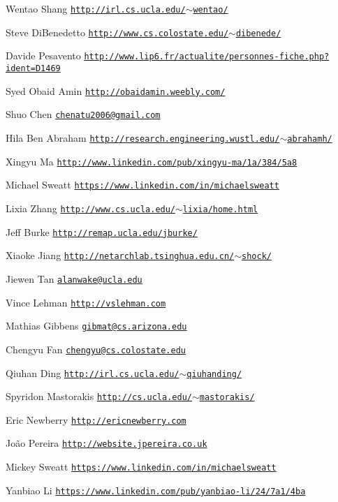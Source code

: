 \begin{DoxyItemize}
\item Wentao Shang \href{http://irl.cs.ucla.edu/~wentao/}{\tt http\+://irl.\+cs.\+ucla.\+edu/$\sim$wentao/}
\item Steve Di\+Benedetto \href{http://www.cs.colostate.edu/~dibenede/}{\tt http\+://www.\+cs.\+colostate.\+edu/$\sim$dibenede/}
\item Davide Pesavento \href{http://www.lip6.fr/actualite/personnes-fiche.php?ident=D1469}{\tt http\+://www.\+lip6.\+fr/actualite/personnes-\/fiche.\+php?ident=\+D1469}
\item Syed Obaid Amin \href{http://obaidamin.weebly.com/}{\tt http\+://obaidamin.\+weebly.\+com/}
\item Shuo Chen \href{mailto:chenatu2006@gmail.com}{\tt chenatu2006@gmail.\+com}
\item Hila Ben Abraham \href{http://research.engineering.wustl.edu/~abrahamh/}{\tt http\+://research.\+engineering.\+wustl.\+edu/$\sim$abrahamh/}
\item Xingyu Ma \href{http://www.linkedin.com/pub/xingyu-ma/1a/384/5a8}{\tt http\+://www.\+linkedin.\+com/pub/xingyu-\/ma/1a/384/5a8}
\item Michael Sweatt \href{https://www.linkedin.com/in/michaelsweatt}{\tt https\+://www.\+linkedin.\+com/in/michaelsweatt}
\item Lixia Zhang \href{http://www.cs.ucla.edu/~lixia/home.html}{\tt http\+://www.\+cs.\+ucla.\+edu/$\sim$lixia/home.\+html}
\item Jeff Burke \href{http://remap.ucla.edu/jburke/}{\tt http\+://remap.\+ucla.\+edu/jburke/}
\item Xiaoke Jiang \href{http://netarchlab.tsinghua.edu.cn/~shock/}{\tt http\+://netarchlab.\+tsinghua.\+edu.\+cn/$\sim$shock/}
\item Jiewen Tan \href{mailto:alanwake@ucla.edu}{\tt alanwake@ucla.\+edu}
\item Vince Lehman \href{http://vslehman.com}{\tt http\+://vslehman.\+com}
\item Mathias Gibbens \href{mailto:gibmat@cs.arizona.edu}{\tt gibmat@cs.\+arizona.\+edu}
\item Chengyu Fan \href{mailto:chengyu@cs.colostate.edu}{\tt chengyu@cs.\+colostate.\+edu}
\item Qiuhan Ding \href{http://irl.cs.ucla.edu/~qiuhanding/}{\tt http\+://irl.\+cs.\+ucla.\+edu/$\sim$qiuhanding/}
\item Spyridon Mastorakis \href{http://cs.ucla.edu/~mastorakis/}{\tt http\+://cs.\+ucla.\+edu/$\sim$mastorakis/}
\item Eric Newberry \href{http://ericnewberry.com}{\tt http\+://ericnewberry.\+com}
\item João Pereira \href{http://website.jpereira.co.uk}{\tt http\+://website.\+jpereira.\+co.\+uk}
\item Mickey Sweatt \href{https://www.linkedin.com/in/michaelsweatt}{\tt https\+://www.\+linkedin.\+com/in/michaelsweatt}
\item Yanbiao Li \href{https://www.linkedin.com/pub/yanbiao-li/24/7a1/4ba}{\tt https\+://www.\+linkedin.\+com/pub/yanbiao-\/li/24/7a1/4ba} 
\end{DoxyItemize}